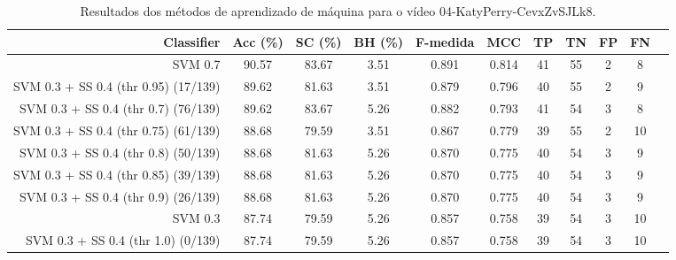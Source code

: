 \begin{table}[!htb]
\centering
\caption{Resultados dos métodos de aprendizado de máquina para o vídeo 04-KatyPerry-CevxZvSJLk8.}
\label{tab:04-KatyPerry-CevxZvSJLk8}
\begin{tabular}{r|c|c|c|c|c|c|c|c|c|c}
\hline\hline
Classifier & Acc (\%) & SC (\%) & BH (\%) & F-medida & MCC & TP & TN & FP & FN \\ \hline
SVM 0.7 & 90.57 & 83.67 & 3.51 & 0.891 & 0.814 & 41 & 55 & 2 & 8 \\ 
SVM 0.3 + SS 0.4 (thr 0.95) (17/139) & 89.62 & 81.63 & 3.51 & 0.879 & 0.796 & 40 & 55 & 2 & 9 \\ 
SVM 0.3 + SS 0.4 (thr 0.7) (76/139) & 89.62 & 83.67 & 5.26 & 0.882 & 0.793 & 41 & 54 & 3 & 8 \\ 
SVM 0.3 + SS 0.4 (thr 0.75) (61/139) & 88.68 & 79.59 & 3.51 & 0.867 & 0.779 & 39 & 55 & 2 & 10 \\ 
SVM 0.3 + SS 0.4 (thr 0.8) (50/139) & 88.68 & 81.63 & 5.26 & 0.870 & 0.775 & 40 & 54 & 3 & 9 \\ 
SVM 0.3 + SS 0.4 (thr 0.85) (39/139) & 88.68 & 81.63 & 5.26 & 0.870 & 0.775 & 40 & 54 & 3 & 9 \\ 
SVM 0.3 + SS 0.4 (thr 0.9) (26/139) & 88.68 & 81.63 & 5.26 & 0.870 & 0.775 & 40 & 54 & 3 & 9 \\ 
SVM 0.3 & 87.74 & 79.59 & 5.26 & 0.857 & 0.758 & 39 & 54 & 3 & 10 \\ 
SVM 0.3 + SS 0.4 (thr 1.0) (0/139) & 87.74 & 79.59 & 5.26 & 0.857 & 0.758 & 39 & 54 & 3 & 10 \\ 
\hline\hline
\end{tabular}
\end{table}
